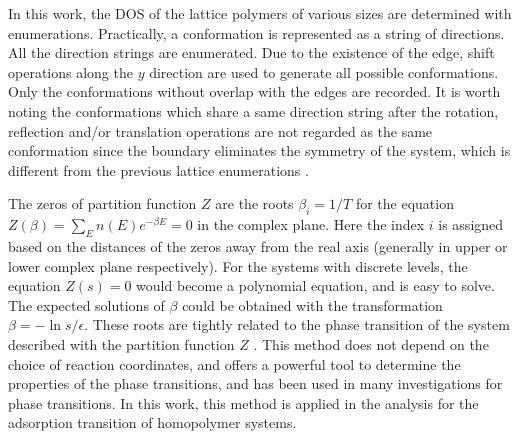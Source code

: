 \documentclass[aps,pre,twocolumn,showpacs,preprintnumbers,amsmath,amssymb]{revtex4-1}
\begin{document}
In this work, the DOS of the lattice polymers of various sizes
are determined with enumerations. Practically, a conformation is
represented as a string of directions. All the direction strings
are enumerated. Due to the existence of the edge, shift
operations along the $y$ direction are used to generate all
possible conformations. Only the conformations without overlap
with the edges are recorded. It is worth noting the
conformations which share a same direction string after the
rotation, reflection and/or translation operations are not
regarded as the same conformation since the boundary eliminates
the symmetry of the system, which is different from the previous
lattice enumerations \cite{CieplakPRL98,PandePRL96}.


The zeros of partition function $Z$ are the roots $\beta_i=1/T$
for the equation $Z(\beta)=\sum_E n(E)e^{-\beta E}=0$ in the
complex plane. Here the index $i$ is assigned based on the
distances of the zeros away from the real axis (generally in
upper or lower complex plane respectively). For the systems with
discrete levels, the equation $Z(s)=0$ would become a polynomial
equation, and is easy to solve. The expected solutions of
$\beta$ could be obtained with the transformation $\beta=-\ln
s/\epsilon$. These roots are tightly related to the phase
transition of the system described with the partition function
$Z$ \cite{LYPR52,FisherBook}. This method does not depend on the
choice of reaction coordinates, and offers a powerful tool to
determine the properties of the phase transitions, and has been
used in many investigations for phase
transitions\cite{LipowskiIJMPB05,JCP10b,
HansmannPRL00,HansmannPA01,WangJCP03,ChenPA05}. In this work,
this method is applied in the analysis for the adsorption
transition of homopolymer systems.
\end{document}
